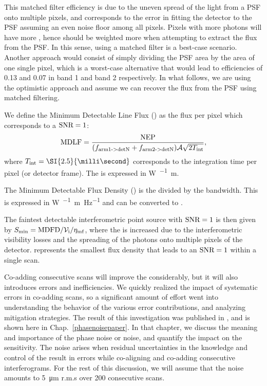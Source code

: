 This matched filter efficiency is due to the uneven spread of the light from a PSF onto multiple pixels, and corresponds to the error in fitting the detector to the PSF assuming an even noise floor among all pixels. Pixels with more photons will have more \SNR, hence should be weighted more when attempting to extract the flux from the PSF. In this sense, using a matched filter is a best-case scenario. Another approach would consist of simply dividing the PSF area by the area of one single pixel, which is a worst-case alternative that would lead to efficiencies of 0.13 and 0.07 in band 1 and band 2 respectively. In what follows, we are using the optimistic approach and assume we can recover the flux from the PSF using matched filtering. 

We define the Minimum Detectable Line Flux (\MDLF) as the flux per pixel which corresponds to a $\textrm{SNR} = 1$:
\begin{align}
\textrm{MDLF} = \frac{\textrm{NEP}}{(f_\textrm{arm1->detN}+ f_\textrm{arm2->detN})\mathcal{A}\sqrt{2T_\textrm{int}}},
\end{align}
where $\Tint = \SI{2.5}{\milli\second}$ corresponds to the integration time per pixel (or detector frame). The \MDLF is expressed in \si{\watt\per{}\meter}.

The Minimum Detectable Flux Density (\MDFD) is the \MDLF divided by the bandwidth. This is expressed in \si{\watt\per{}\meter\per\hertz} and can be converted to \si{\jansky}.

The faintest detectable interferometric point source with $\textrm{SNR} = 1$ is then given by $S_\textrm{min}= \textrm{MDFD}/\mathcal{V}_\textrm{i}/\eta_\textrm{mf}$, where the \MDFD is increased due to the interferometric visibility losses and the spreading of the photons onto multiple pixels of the detector. \Smin represents the smallest flux density that leads to an $\textrm{SNR} = 1$ within a single scan.

Co-adding consecutive scans will improve the \SNR considerably, but it will also introduces errors and inefficiencies. We quickly realized the impact of systematic errors in co-adding scans, so a significant amount of effort went into understanding the behavior of the various error contributions, and analyzing mitigation strategies. The result of this investigation was published in \citet{Rizzo:2015gf}, and is shown here in Chap.~\ref{phasenoisepaper}. In that chapter, we discuss the meaning and importance of the phase noise or \OPD noise, and quantify the impact on the sensitivity. The \OPD noise arises when residual uncertainties in the knowledge and control of the \OPD result in errors while co-aligning and co-adding consecutive interferograms. For the rest of this discussion, we will assume that the \OPD noise amounts to \SI{5}{\micro\meter} r.m.s over 200 consecutive scans.

